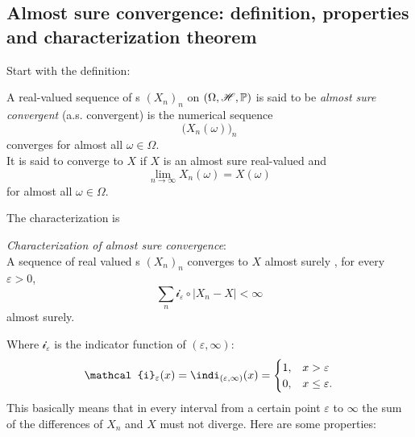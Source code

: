 \documentclass{report}
\begin{document}
\subsection{Almost sure convergence: definition, properties and characterization theorem}
Start with the definition:
\begin{definition}
	A real-valued sequence of \rv s ${(X_n)}_{n}$ on $(\Omega,\mathscr{H},\mathbb{P})$ is said to be \emph{almost sure convergent} (a.s. convergent) is the numerical sequence
	\[{\Big(X_n(\omega)\Big)}_{n}\]
	converges for almost all $\omega\in\Omega$. \\
	It is said to converge to $X$ if $X$ is an almost sure real-valued \rv{} and 
	\[\lim_{n\to\infty}X_n(\omega)=X(\omega)\]
	for almost all $\omega\in\Omega$.
\end{definition}
The characterization is
\begin{theorem}
	\emph{Characterization of almost sure convergence}:\\
	A sequence of real valued \rv s ${(X_n)}_{n}$ converges to $X$ almost surely \ifonly{}, for every $\varepsilon>0$,
	\begin{equation*}
		\sum_n\mathcal{i}_\varepsilon\circ|X_n-X|<\infty
	\end{equation*}
	almost surely.
\end{theorem} Where $\mathcal{i}_\varepsilon$  is the indicator function of $(\varepsilon,\infty)$:
\[\mathcal{i}_\varepsilon(x)=\indi_{(\varepsilon,\infty)}(x)=\begin{cases}
1, &x>\varepsilon\\
0, &x\leq \varepsilon.
\end{cases}\]
This basically means that in every interval from a certain point $\varepsilon$ to $\infty$ the sum of the differences of $X_n$ and $X$ must not diverge. Here are some properties:
\end{document}
